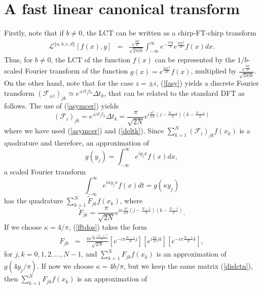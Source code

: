 \documentclass[12pt]{article}
\begin{document}
\section{A fast linear canonical transform}\label{sectres}
Firstly, note that if $b\ne 0$, the LCT can be written as a chirp-FT-chirp transform
\begin{eqnarray}\label{lctdos}
{\mathcal L}^{\{a,b,c,d\}}[f(x),y]&=&\frac{e^{\frac{idy^2}{2b}}}{\sqrt{2\pi i  b}}\int_{-\infty}^\infty e^{-\frac{ixy}{b}}e^{\frac{iax^2}{2b}}f(x)dx.\nonumber
\end{eqnarray}
Thus, for $b\ne 0$, the LCT of the function $f(x)$ can be represented by the $1/b$-scaled Fourier transform of the function $g(x)=e^{\frac{iax^2}{2b}}f(x)$,
multiplied by $\frac{e^{\frac{idy^2}{2b}}}{\sqrt{2\pi i  b}}$.\\
On the other hand, note that for the case $z=\pm i$, (\ref{fasy}) yields a discrete Fourier transform $({\mathcal F}_{\pm i})_{jk}\simeq e^{\pm it_jt_k}\Delta t_k$, that can be related to the standard DFT as follows. The use of (\ref{asymcer}) yields
\begin{equation}\label{fftuno}
({\mathcal F}_i)_{jk}=e^{\pm it_jt_k}\Delta t_k=\frac{\pi}{\sqrt{2N}} e^{i\frac{\pi^2}{2N} \left(j-\frac{N-1}{2}\right) \left(k-\frac{N-1}{2}\right)}
\end{equation}
where we have used (\ref{asymcer}) and (\ref{deltk}). Since $\sum_{k=1}^N({\mathcal F}_i)_{jk}f(x_k)$ is a quadrature and therefore, an approximation of
\[
g(y_j)=\int_{-\infty}^\infty e^{i y_j x} f(x)dx,
\]
a scaled Fourier transform
\begin{equation}\label{furesc}
\int_{-\infty}^\infty e^{i \kappa y_j x} f(x)dt=g(\kappa y_j)
\end{equation}
has the quadrature $\sum_{k=1}^N\tilde{F}_{jk}f(x_k)$, where 
\begin{equation}\label{fftdos}
\tilde{F}_{jk}=\frac{\pi}{\sqrt{2N}}e^{i \kappa\frac{\pi^2}{2N} \left(j-\frac{N-1}{2}\right) \left(k-\frac{N-1}{2}\right)}.
\end{equation}
If we choose $\kappa=4/\pi$, (\ref{fftdos}) takes the form 
\begin{eqnarray}\label{dislctn}
F_{jk}&=&\frac{\pi e^{i\frac{\pi}{2}\frac{(N-1)^2}{N}}}{\sqrt{2N}}\left[e^{-i\pi\frac{N-1}{N} j}\right]\left[e^{i\frac{2\pi}{N}jk}\right]\nonumber
\left[e^{-i\pi\frac{N-1}{N} k}\right],
\end{eqnarray}
for $ j,k=0,1,2,\ldots,N-1$, and $\sum_{k=1}^NF_{jk}f(x_k)$ is an approximation of $g(4 y_j/\pi)$.  If now we choose $\kappa=4b/\pi$, but we keep the same matrix (\ref{dislctn}), then $\sum_{k=1}^NF_{jk}f(x_k)$ is an approximation of 
\end{document}
